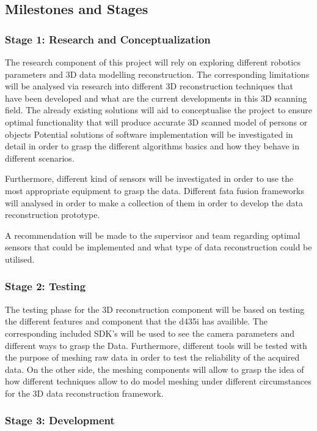 \documentclass[12pt]{report}
\begin{document}
\subsection{Milestones and Stages}
\subsubsection{	Stage 1: Research and Conceptualization }
The research component of this project will rely on exploring different robotics parameters and 3D data modelling reconstruction. 
The corresponding limitations will be  analysed via research into different 3D reconstruction techniques that have been developed and what are the current developments in this 3D scanning field. 
The already existing solutions will aid to conceptualise the project to ensure optimal functionality that will produce accurate 3D scanned model of persons or objects
Potential solutions of software implementation will be investigated in detail in order to grasp the different algorithms basics and how they behave in different scenarios. 

Furthermore, different kind of sensors will be investigated in order to use the most appropriate equipment to grasp the data. Different fata fusion frameworks will analysed in order to make a collection of them in order to develop the data reconstruction prototype. 

A recommendation will be made to the supervisor and team regarding optimal sensors that could be implemented and what type of data reconstruction could be utilised. 
\enlargethispage{\baselineskip}

\subsubsection{Stage 2: Testing}
The testing phase for the 3D reconstruction component will be based on testing the different features and component that the d435i has availible. The corresponding included SDK’s will be used to see the camera parameters and different ways to grasp the Data. 
Furthermore, different tools will be tested with the purpose of meshing raw data in order to test the reliability of the acquired data. 
On the other side, the meshing components will allow to grasp the idea of how different techniques allow to do model meshing under different circumstances for the 3D data reconstruction framework. 

\subsubsection{Stage 3: Development}
\end{document}
